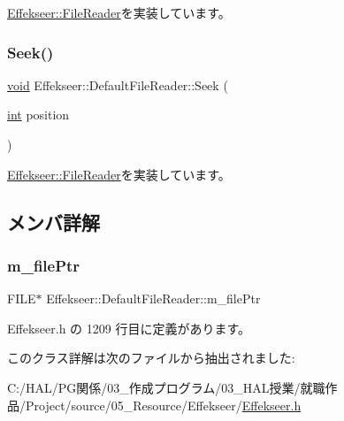 \mbox{\hyperlink{class_effekseer_1_1_file_reader_a6274b775770e8ac9ba4f212c80e94be1}{Effekseer\+::\+File\+Reader}}を実装しています。

\mbox{\label{class_effekseer_1_1_default_file_reader_a9c9e821e4508708a2c91a9ab486b2709}} 
\subsubsection{\texorpdfstring{Seek()}{Seek()}}
{\footnotesize\ttfamily \mbox{\hyperlink{namespace_effekseer_ab34c4088e512200cf4c2716f168deb56}{void}} Effekseer\+::\+Default\+File\+Reader\+::\+Seek (\begin{DoxyParamCaption}\item[{\mbox{\hyperlink{namespace_effekseer_ace0abf7c2e6947e519ebe8b54cbcc30a}{int}}}]{position }\end{DoxyParamCaption})\hspace{0.3cm}{\ttfamily [virtual]}}



\mbox{\hyperlink{class_effekseer_1_1_file_reader_a5daeb98049f994bccf874b2374e36a25}{Effekseer\+::\+File\+Reader}}を実装しています。



\subsection{メンバ詳解}
\mbox{\label{class_effekseer_1_1_default_file_reader_a8377211af30419cd2a8b6d220fe8972d}} 
\subsubsection{\texorpdfstring{m\+\_\+file\+Ptr}{m\_filePtr}}
{\footnotesize\ttfamily F\+I\+LE$\ast$ Effekseer\+::\+Default\+File\+Reader\+::m\+\_\+file\+Ptr\hspace{0.3cm}{\ttfamily [private]}}



 Effekseer.\+h の 1209 行目に定義があります。



このクラス詳解は次のファイルから抽出されました\+:\begin{DoxyCompactItemize}
\item 
C\+:/\+H\+A\+L/\+P\+G関係/03\+\_\+作成プログラム/03\+\_\+\+H\+A\+L授業/就職作品/\+Project/source/05\+\_\+\+Resource/\+Effekseer/\mbox{\hyperlink{_effekseer_8h}{Effekseer.\+h}}\end{DoxyCompactItemize}
